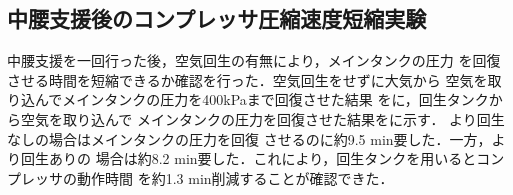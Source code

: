  \subsection{中腰支援後のコンプレッサ圧縮速度短縮実験}
中腰支援を一回行った後，空気回生の有無により，メインタンクの圧力
を回復させる時間を短縮できるか確認を行った．空気回生をせずに大気から
空気を取り込んでメインタンクの圧力を400kPaまで回復させた結果
をに，回生タンクから空気を取り込んで
メインタンクの圧力を回復させた結果をに示す．
より回生なしの場合はメインタンクの圧力を回復
させるのに約9.5 min要した．一方，より回生ありの
場合は約8.2 min要した．これにより，回生タンクを用いるとコンプレッサの動作時間
を約1.3 min削減することが確認できた．